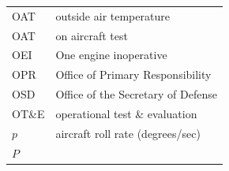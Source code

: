 \documentclass[
]{book}
\begin{document}
\begin{longtable}[]{@{}ll@{}}
\begin{minipage}[t]{0.47\columnwidth}
OAT\strut
\end{minipage} & \begin{minipage}[t]{0.47\columnwidth}\raggedright
outside air temperature\strut
\end{minipage}\tabularnewline
\begin{minipage}[t]{0.47\columnwidth}\raggedright
OAT\strut
\end{minipage} & \begin{minipage}[t]{0.47\columnwidth}\raggedright
on aircraft test\strut
\end{minipage}\tabularnewline
\begin{minipage}[t]{0.47\columnwidth}\raggedright
OEI\strut
\end{minipage} & \begin{minipage}[t]{0.47\columnwidth}\raggedright
One engine inoperative\strut
\end{minipage}\tabularnewline
\begin{minipage}[t]{0.47\columnwidth}\raggedright
OPR\strut
\end{minipage} & \begin{minipage}[t]{0.47\columnwidth}\raggedright
Office of Primary Responsibility\strut
\end{minipage}\tabularnewline
\begin{minipage}[t]{0.47\columnwidth}\raggedright
OSD\strut
\end{minipage} & \begin{minipage}[t]{0.47\columnwidth}\raggedright
Office of the Secretary of Defense\strut
\end{minipage}\tabularnewline
\begin{minipage}[t]{0.47\columnwidth}\raggedright
OT\&E\strut
\end{minipage} & \begin{minipage}[t]{0.47\columnwidth}\raggedright
operational test \& evaluation\strut
\end{minipage}\tabularnewline
\begin{minipage}[t]{0.47\columnwidth}\raggedright
\(p\)\strut
\end{minipage} & \begin{minipage}[t]{0.47\columnwidth}\raggedright
aircraft roll rate (degrees/sec)\strut
\end{minipage}\tabularnewline
\begin{minipage}[t]{0.47\columnwidth}\raggedright
\(P\)\strut
\end{minipage} & \begin{minipage}[t]{0.47\columnwidth}\raggedright

\end{minipage}
\end{longtable}
\end{document}
